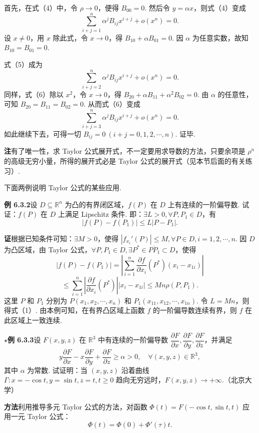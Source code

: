 \documentclass[UTF8,12pt,a4paper,fontset=fandol]{ctexart}
\begin{document}
首先，在式（4）中，令 $\rho\to0$，便得 $B_{00}=0$. 然后令 $y=\alpha x$，则式（4）变成
\[
  \sum_{i+j=1}^{n}\alpha^jB_{ij}x^{i+j}+o(x^n)=0. \tag{5}
\]
设 $x\ne0$，用 $x$ 除此式，令 $x\to0$，得 $B_{10}+\alpha B_{01}=0$. 因 $\alpha$ 为任意实数，故知 $B_{10}=B_{01}=0$.

式（5）成为
\[
  \sum_{i+j=2}^{n}\alpha^jB_{ij}x^{i+j}+o(x^n)=0. \tag{6}
\]
同样，式（6）除以 $x^2$，令 $x\to0$，得 $B_{20}+\alpha B_{11}+\alpha^2B_{02}=0$. 由 $\alpha$ 的任意性，可知 $B_{20}=B_{11}=B_{02}=0$. 从而式（6）变成
\[
  \sum_{i+j=3}^{n}\alpha^jB_{ij}x^{i+j}+o(x^n)=0.
\]
如此继续下去，可得一切 $B_{ij}=0\ (i+j=0,1,2,\cdots,n)$. 证毕.

\noindent\textbf{注}\quad 有了唯一性，求 Taylor 公式展开式，不一定要用求导数的方法，只要余项是 $\rho^n$ 的高级无穷小量，所得的展开式必是 Taylor 公式的展开式（见本节后面的有关练习）.

下面两例说明 Taylor 公式的某些应用.

\noindent\textbf{例 6.3.2}\quad 设 $D\subseteq\mathbb{R}^n$ 为凸的有界闭区域，$f(P)$ 在 $D$ 上有连续的一阶偏导数. 试证：$f(P)$ 在 $D$ 上满足 Lipschitz 条件. 即：$\exists L>0,\forall P,P_1\in D$，有
\[
  |f(P)-f(P_1)|\le L|P-P_1|. \tag{1}
\]

\noindent\textbf{证}\quad 根据已知条件可知：$\exists M>0$，使得 $|f_{x_i}'(P)|\le M,\forall P\in D,i=1,2,\cdots,n$. 因 $D$ 为凸区域，由 Taylor 公式，$\forall P,P_1\in D,\exists P^*\in\overline{PP_1}\subset D$，使得
\[
  |f(P)-f(P_1)|
  =\left|\sum_{i=1}^{n}\frac{\partial f}{\partial x_i}(P^*)(x_i-x_{1i})\right|
\]
\[
  \le\sum_{i=1}^{n}\left|\frac{\partial f}{\partial x_i}(P^*)\right||x_i-x_{1i}|
  \le Mn\rho(P,P_1).
\]
这里 $P$ 和 $P_1$ 分别为 $P(x_1,x_2,\cdots,x_n)$ 和 $P_1(x_{11},x_{12},\cdots,x_{1n})$. 令 $L=Mn$，则得式（1）. 由本例可知，在有界凸区域上函数 $f$ 的一阶偏导数连续有界，则 $f$ 在此区域上一致连续.

\noindent\textbf{\ensuremath{\star}例 6.3.3}\quad 设 $F(x,y,z)$ 在 $\mathbb{R}^3$ 中有连续的一阶偏导数 $\dfrac{\partial F}{\partial x},\dfrac{\partial F}{\partial y},\dfrac{\partial F}{\partial z}$，并满足
\[
  y\frac{\partial F}{\partial x}-x\frac{\partial F}{\partial y}
  +\frac{\partial F}{\partial z}\ge\alpha>0,\quad \forall(x,y,z)\in\mathbb{R}^3,
\]
其中 $\alpha$ 为常数. 试证明：当 $(x,y,z)$ 沿着曲线 $\Gamma:x=-\cos t,y=\sin t,z=t,t\ge0$ 趋向无穷远时，$F(x,y,z)\to+\infty$.（北京大学）

\noindent\textbf{方法}\quad 利用推导多元 Taylor 公式的方法，对函数 $\Phi(t)=F(-\cos t,\sin t,t)$ 应用一元 Taylor 公式：
\[
  \Phi(t)=\Phi(0)+\Phi'(\tau)t.
\]
\end{document}
